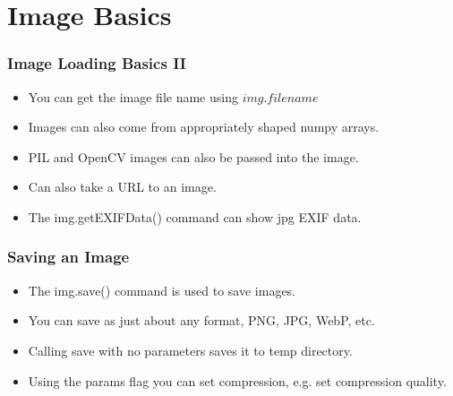 \documentclass{beamer}
\begin{document}
 \section{Image Basics}
\begin{frame}
\frametitle{Image Loading Basics II}
\begin{itemize}
\item You can get the image file name using $img.filename$
\item Images can also come from appropriately shaped numpy arrays.
\item PIL and OpenCV images can also be passed into the image.
\item Can also take a URL to an image. 
\item The \alert<+>{img.getEXIFData()} command can show jpg EXIF data.
\end{itemize}
\end{frame}

\begin{frame}
\frametitle{Saving an Image}
\begin{itemize}
\item The \alert<+>{img.save()} command is used to save images.
\item You can save as just about any format, PNG, JPG, WebP, etc.
\item Calling save with no parameters saves it to temp directory.
\item Using the params flag you can set compression, e.g. set
  compression quality. 
\end{itemize}
\end{frame}
\end{document}

